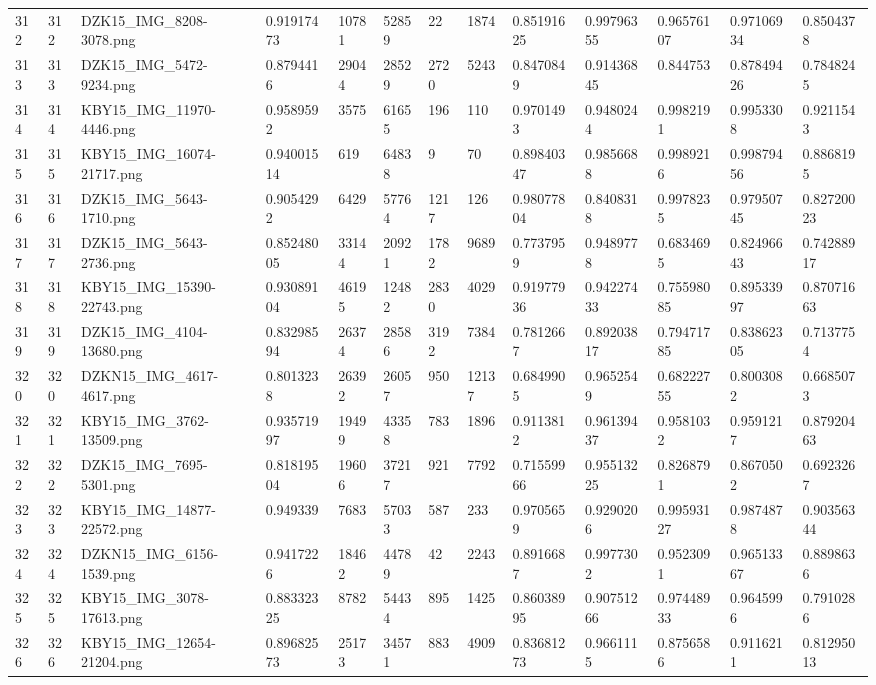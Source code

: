 \documentclass[11pt, a4paper, twoside]{report}
\begin{document}
\begin{longtable}[c]{@{}lllllllllllll@{}}
312 & 312 & DZK15\_IMG\_8208-3078.png & 0.91917473 & 10781 & 52859 & 22 & 1874 & 0.85191625 & 0.99796355 & 0.96576107 & 0.97106934 & 0.8504378 \\
313 & 313 & DZK15\_IMG\_5472-9234.png & 0.8794416 & 29044 & 28529 & 2720 & 5243 & 0.8470849 & 0.91436845 & 0.844753 & 0.87849426 & 0.7848245 \\
314 & 314 & KBY15\_IMG\_11970-4446.png & 0.9589592 & 3575 & 61655 & 196 & 110 & 0.9701493 & 0.9480244 & 0.9982191 & 0.9953308 & 0.9211543 \\
315 & 315 & KBY15\_IMG\_16074-21717.png & 0.94001514 & 619 & 64838 & 9 & 70 & 0.89840347 & 0.9856688 & 0.9989216 & 0.99879456 & 0.8868195 \\
316 & 316 & DZK15\_IMG\_5643-1710.png & 0.9054292 & 6429 & 57764 & 1217 & 126 & 0.98077804 & 0.8408318 & 0.9978235 & 0.97950745 & 0.82720023 \\
317 & 317 & DZK15\_IMG\_5643-2736.png & 0.85248005 & 33144 & 20921 & 1782 & 9689 & 0.7737959 & 0.9489778 & 0.6834695 & 0.82496643 & 0.74288917 \\
318 & 318 & KBY15\_IMG\_15390-22743.png & 0.93089104 & 46195 & 12482 & 2830 & 4029 & 0.91977936 & 0.94227433 & 0.75598085 & 0.89533997 & 0.87071663 \\
319 & 319 & DZK15\_IMG\_4104-13680.png & 0.83298594 & 26374 & 28586 & 3192 & 7384 & 0.7812667 & 0.89203817 & 0.79471785 & 0.83862305 & 0.7137754 \\
320 & 320 & DZKN15\_IMG\_4617-4617.png & 0.8013238 & 26392 & 26057 & 950 & 12137 & 0.6849905 & 0.9652549 & 0.68222755 & 0.8003082 & 0.6685073 \\
321 & 321 & KBY15\_IMG\_3762-13509.png & 0.93571997 & 19499 & 43358 & 783 & 1896 & 0.9113812 & 0.96139437 & 0.9581032 & 0.9591217 & 0.87920463 \\
322 & 322 & DZK15\_IMG\_7695-5301.png & 0.81819504 & 19606 & 37217 & 921 & 7792 & 0.71559966 & 0.95513225 & 0.8268791 & 0.8670502 & 0.6923267 \\
323 & 323 & KBY15\_IMG\_14877-22572.png & 0.949339 & 7683 & 57033 & 587 & 233 & 0.9705659 & 0.9290206 & 0.99593127 & 0.9874878 & 0.90356344 \\
324 & 324 & DZKN15\_IMG\_6156-1539.png & 0.9417226 & 18462 & 44789 & 42 & 2243 & 0.8916687 & 0.9977302 & 0.9523091 & 0.96513367 & 0.8898636 \\
325 & 325 & KBY15\_IMG\_3078-17613.png & 0.88332325 & 8782 & 54434 & 895 & 1425 & 0.86038995 & 0.90751266 & 0.97448933 & 0.9645996 & 0.7910286 \\
326 & 326 & KBY15\_IMG\_12654-21204.png & 0.89682573 & 25173 & 34571 & 883 & 4909 & 0.83681273 & 0.9661115 & 0.8756586 & 0.9116211 & 0.81295013 \\

\end{longtable}
\end{document}
